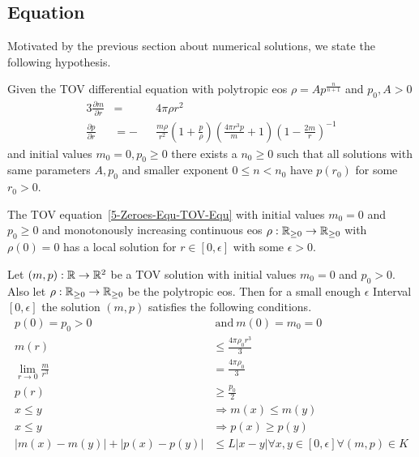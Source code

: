 \subsection{\texorpdfstring{}{TOV} Equation}
\label{subsec:5-Zeroes-TOV-Equ}
Motivated by the previous section about numerical solutions, we state the following hypothesis.
\begin{hypothesis}
	Given the \ac{TOV} differential equation with polytropic \ac{eos} $\rho=Ap^{\frac{n}{n+1}}$ and $p_0,A>0$
	\begin{alignat}{3}
		\frac{\partial m}{\partial r} &= &&4\pi\rho r^2\\
		\frac{\partial p}{\partial r} &= -&&\frac{m\rho}{r^2}\left(1+\frac{p}{\rho}\right)\left(\frac{4\pi r^3 p}{m}+1\right)\left(1-\frac{2m}{r}\right)^{-1}
		\label{5-Zeroes-Equ-TOV-Equ}
	\end{alignat}
	and initial values $m_0=0,p_0\geq0$ there exists a $n_0\geq0$ such that all solutions with same parameters $A,p_0$ and smaller exponent $0\leq n<n_0$ have $p(r_0)$ for some $r_0>0$.
\end{hypothesis}
\begin{lemma}
	The \ac{TOV} equation~\ref{5-Zeroes-Equ-TOV-Equ} with initial values $m_0=0$ and $p_0\geq0$ and monotonously increasing continuous \ac{eos} $\rho:\mathbb{R}_{\geq0}\rightarrow\mathbb{R}_{\geq0}$ with $\rho(0)=0$ has a local solution for $r\in[0,\epsilon]$ with some $\epsilon>0$.
\end{lemma}
\begin{lemma}
	\label{5-Zeroes-Lem-TOV-Conditions}
	Let $(m,p):\mathbb{R}\rightarrow\mathbb{R}^2$ be a \ac{TOV} solution with initial values $m_0=0$ and $p_0>0$.
	Also let $\rho:\mathbb{R}_{\geq0}\rightarrow\mathbb{R}_{\geq0}$ be the polytropic \ac{eos}.
	Then for a small enough $\epsilon$ Interval $[0,\epsilon]$ the solution $(m,p)$ satisfies the following conditions.
	\begin{align}
		p(0)=p_0>0 &\mathrm{\ and\ } m(0)=m_0=0\label{5-Zeroes-Equ-TOV-Conditions-0}\\
		m(r) &\leq \frac{4\pi\rho_0 r^3}{3}\label{5-Zeroes-Equ-TOV-Conditions-1}\\
		\lim_{r\rightarrow0}\frac{m}{r^3}&=\frac{4\pi\rho_0}{3}\label{5-Zeroes-Equ-TOV-Conditions-2}\\
		p(r)&\geq\frac{p_0}{2}\label{5-Zeroes-Equ-TOV-Conditions-3}\\
		x\leq y&\Rightarrow m(x)\leq m(y)\label{5-Zeroes-Equ-TOV-Conditions-4}\\
		x\leq y&\Rightarrow p(x)\geq p(y)\label{5-Zeroes-Equ-TOV-Conditions-5}\\
		|m(x)-m(y)|+|p(x)-p(y)|&\leq L|x-y|\forall x,y\in[0,\epsilon]\forall(m,p)\in K\label{5-Zeroes-Equ-TOV-Conditions-6}
	\end{align}
\end{lemma}

